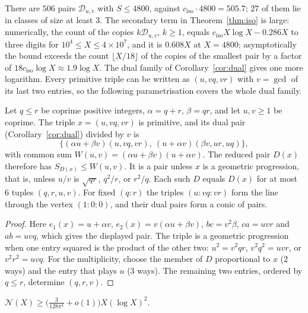 \documentclass[10pt]{article}
\newcommand{\N}{\mathcal{N}}
\newcommand{\ciso}{c_{\mathrm{iso}}}
\begin{document}
There are $506$ pairs $\mathcal D_{u,v}$ with $S\le4800$, against $\ciso\cdot4800=505.7$; $27$ of them lie in classes of size at least $3$. The secondary term in Theorem~\ref{thm:iso} is large: numerically, the count of the copies $k\mathcal D_{u,v}$, $k\ge1$, equals $\ciso X\log X-0.286X$ to three digits for $10^4\le X\le4\times10^7$, and it is $0.608X$ at $X=4800$; asymptotically the bound exceeds the count $\lfloor X/18\rfloor$ of the copies of the smallest pair by a factor of $18\ciso\log X\approx1.9\log X$. The dual family of Corollary~\ref{cor:dual} gives one more logarithm. Every primitive triple can be written as $(u,vq,vr)$ with $v=\gcd$ of its last two entries, so the following parametrisation covers the whole dual family.

\begin{lemma}\label{lem:conic}
Let $q\le r$ be coprime positive integers, $\alpha=q+r$, $\beta=qr$, and let $u,v\ge1$ be coprime. The triple $x=(u,vq,vr)$ is primitive, and its dual pair (Corollary~\ref{cor:dual}) divided by $v$ is
\[
  \big\{(\alpha u+\beta v)(u,vq,vr),\ (u+\alpha v)(\beta v,ur,uq)\big\},
\]
with common sum $W(u,v)=(\alpha u+\beta v)(u+\alpha v)$. The reduced pair $D(x)$ therefore has $S_{D(x)}\le W(u,v)$. It is a pair unless $x$ is a geometric progression, that is, unless $u/v$ is $\sqrt{qr}$, $q^2/r$, or $r^2/q$. Each such $D$ equals $D(x)$ for at most $6$ tuples $(q,r,u,v)$. For fixed $(q:r)$ the triples $(u:vq:vr)$ form the line through the vertex $(1:0:0)$, and their dual pairs form a conic of pairs.
\end{lemma}

\begin{proof}
Here $e_1(x)=u+\alpha v$, $e_2(x)=v(\alpha u+\beta v)$, $bc=v^2\beta$, $ca=uvr$ and $ab=uvq$, which gives the displayed pair. The triple is a geometric progression when one entry squared is the product of the other two: $u^2=v^2qr$, $v^2q^2=uvr$, or $v^2r^2=uvq$. For the multiplicity, choose the member of $D$ proportional to $x$ ($2$ ways) and the entry that plays $u$ ($3$ ways). The remaining two entries, ordered by $q\le r$, determine $(q,r,v)$.
\end{proof}

\begin{proposition}\label{thm:loglog}
$\N(X)\ge\big(\frac3{128\pi^4}+o(1)\big)X(\log X)^2$.
\end{proposition}
\end{document}
